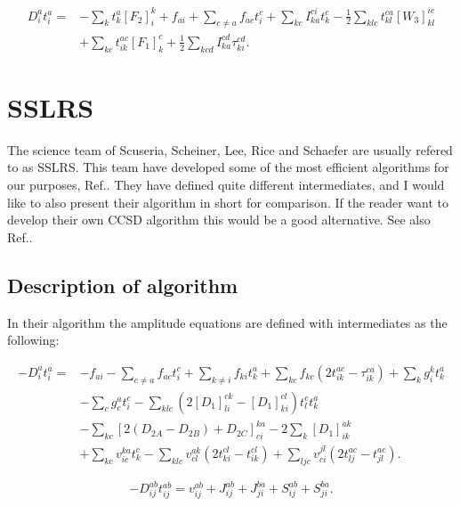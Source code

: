 \documentclass[a4paper,norsk,11pt,twoside]{report}
\begin{document}
\begin{align}
D_i^a t_i^a = &
- \sum_{k} t_k^a
[F_2]_i^k
+ f_{ai} 
+ \sum_{c \not= a} f_{ac} t_i^c
+ \sum_{kc} I_{ka}^{ci} t_k^c 
- \frac{1}{2} \sum_{klc} t_{kl}^{ca} [W_3]_{kl}^{ic}
\nonumber \\ &
+ \sum_{kc} t_{ik}^{ac} [F_1]_k^c
+ \frac{1}{2} \sum_{kcd} I_{ka}^{cd} \tau_{ki}^{cd} 
.  \label{LINK_THIS_SHIT_1_T1}
\end{align}

\section{SSLRS}

The science team of Scuseria, Scheiner, Lee, Rice and Schaefer are usually refered to as SSLRS. This team have developed some of the most efficient algorithms for our purposes, Ref.\cite{sslrs_citation2}. They have defined quite different intermediates, and I would like to also present their algorithm in short for comparison. If the reader want to develop their own CCSD algorithm this would be a good alternative. See also Ref.\cite{sslrs_citation1}.

\subsection{Description of algorithm}

In their algorithm the amplitude equations are defined with intermediates as the following:

\begin{align}
- D_i^a t_i^a = &
- f_{ai} 
- \sum_{c \not= a} f_{ac} t_i^c 
+ \sum_{k \not= i} f_{ki} t_k^a
+ \sum_{kc} f_{kc} (2t_{ik}^{ac} - \tau_{ik}^{ca})
+ \sum_k g_i^k t_k^a \label{SSRS1} \\ &
- \sum_c g_c^a t_i^c 
- \sum_{klc} \left( 2 [D_1]_{li}^{ck} - [D_1]_{ki}^{cl} \right) t_l^c t_k^a \nonumber \\ &
- \sum_{kc} [2(D_{2A} - D_{2B}) + D_{2C}]_{ci}^{ka} 
- 2 \sum_k [D_1]_{ik}^{ak}  \nonumber \\ &
+ \sum_{kc} v_{ic}^{ka} t_k^c
- \sum_{klc} v_{cl}^{ak} ( 2 t_{ki}^{cl} - t_{ik}^{cl} )
+ \sum_{ljc} v_{ci}^{jl} ( 2 t_{lj}^{ac} - t_{jl}^{ac} ) .
\nonumber
\end{align}

\begin{equation}
- D_{ij}^{ab} t_{ij}^{ab} = v_{ij}^{ab} + J_{ij}^{ab} + J_{ji}^{ba} + S_{ij}^{ab} + S_{ji}^{ba} . \label{SSRS2}
\end{equation}
\end{document}
